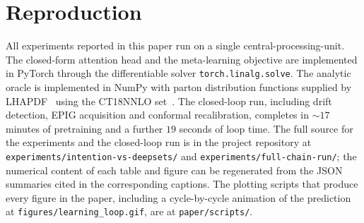 \documentclass[11pt,a4paper]{article}
\begin{document}
\section{Reproduction}
\label{app:reproduction}

All experiments reported in this paper run on a single central-processing-unit. The closed-form attention head and the meta-learning objective are implemented in PyTorch through the differentiable solver \texttt{torch.linalg.solve}. The analytic oracle is implemented in NumPy with parton distribution functions supplied by LHAPDF~\cite{Buckley:2014lhapdf} using the CT18NNLO set~\cite{Hou:2019ct18}. The closed-loop run, including drift detection, EPIG acquisition and conformal recalibration, completes in $\sim 17$ minutes of pretraining and a further $19$ seconds of loop time. The full source for the experiments and the closed-loop run is in the project repository at \texttt{experiments/intention-vs-deepsets/} and \texttt{experiments/full-chain-run/}; the numerical content of each table and figure can be regenerated from the JSON summaries cited in the corresponding captions. The plotting scripts that produce every figure in the paper, including a cycle-by-cycle animation of the prediction at \texttt{figures/learning\_loop.gif}, are at \texttt{paper/scripts/}.



\end{document}
